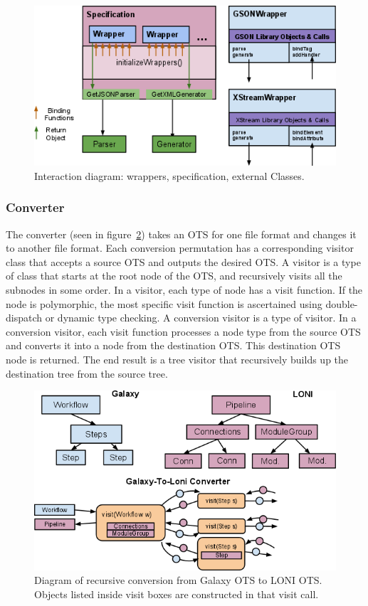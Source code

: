 \documentclass[12pt]{article}
\begin{document}
\begin{figure}
\centering
\includegraphics[width=\textwidth]{interaction.png}
\caption{Interaction diagram: wrappers, specification, external Classes.}
\label{fig:interaction}
\end{figure}

\subsubsection{Converter}

The converter (seen in figure~\ref{fig:conversion}) takes an OTS for one file format and changes it to another file format. Each conversion permutation has a corresponding visitor class that accepts a source OTS and outputs the desired OTS. A visitor is a type of class that starts at the root node of the OTS, and recursively visits all the subnodes in some order. In a visitor, each type of node has a visit function. If the node is polymorphic, the most specific visit function is ascertained using double-dispatch or dynamic type checking.  A conversion visitor is a type of visitor. In a conversion visitor, each visit function processes a node type from the source OTS and converts it into a node from the destination OTS. This destination OTS node is returned.  The end result is a tree visitor that recursively builds up the destination tree from the source tree.

\begin{figure}[htbp]
\centering
\includegraphics[width=\textwidth]{conversion.png}
\caption{Diagram of recursive conversion from Galaxy OTS to LONI OTS. Objects listed inside visit boxes are constructed in that visit call.}
\label{fig:conversion}
\end{figure}
\end{document}
